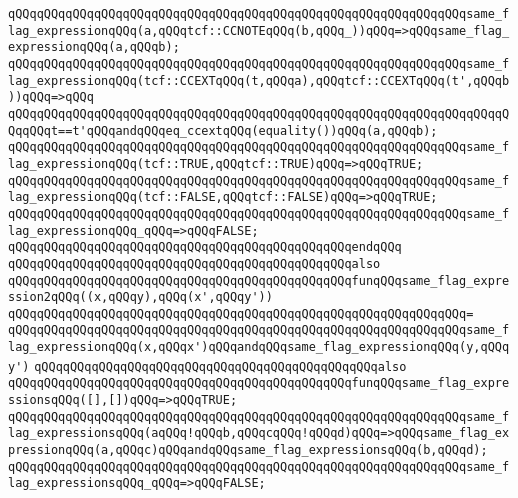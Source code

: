 \verb|qQQqqQQqqQQqqQQqqQQqqQQqqQQqqQQqqQQqqQQqqQQqqQQqqQQqqQQqqQQqqQQqsame_flag_expressionqQQq(a,qQQqtcf::CCNOTEqQQq(b,qQQq_))qQQq=>qQQqsame_flag_expressionqQQq(a,qQQqb);|\newline
\verb|qQQqqQQqqQQqqQQqqQQqqQQqqQQqqQQqqQQqqQQqqQQqqQQqqQQqqQQqqQQqqQQqsame_flag_expressionqQQq(tcf::CCEXTqQQq(t,qQQqa),qQQqtcf::CCEXTqQQq(t',qQQqb))qQQq=>qQQq|\newline
\verb|qQQqqQQqqQQqqQQqqQQqqQQqqQQqqQQqqQQqqQQqqQQqqQQqqQQqqQQqqQQqqQQqqQQqqQQqqQQqt==t'qQQqandqQQqeq_ccextqQQq(equality())qQQq(a,qQQqb);|\newline
\verb|qQQqqQQqqQQqqQQqqQQqqQQqqQQqqQQqqQQqqQQqqQQqqQQqqQQqqQQqqQQqqQQqsame_flag_expressionqQQq(tcf::TRUE,qQQqtcf::TRUE)qQQq=>qQQqTRUE;|\newline
\verb|qQQqqQQqqQQqqQQqqQQqqQQqqQQqqQQqqQQqqQQqqQQqqQQqqQQqqQQqqQQqqQQqsame_flag_expressionqQQq(tcf::FALSE,qQQqtcf::FALSE)qQQq=>qQQqTRUE;|\newline
\verb|qQQqqQQqqQQqqQQqqQQqqQQqqQQqqQQqqQQqqQQqqQQqqQQqqQQqqQQqqQQqqQQqsame_flag_expressionqQQq_qQQq=>qQQqFALSE;|\newline
\verb|qQQqqQQqqQQqqQQqqQQqqQQqqQQqqQQqqQQqqQQqqQQqqQQqendqQQq|\newline
\newline
\verb|qQQqqQQqqQQqqQQqqQQqqQQqqQQqqQQqqQQqqQQqqQQqqQQqalso|\newline
\verb|qQQqqQQqqQQqqQQqqQQqqQQqqQQqqQQqqQQqqQQqqQQqqQQqfunqQQqsame_flag_expression2qQQq((x,qQQqy),qQQq(x',qQQqy'))|\newline
\verb|qQQqqQQqqQQqqQQqqQQqqQQqqQQqqQQqqQQqqQQqqQQqqQQqqQQqqQQqqQQqqQQq=|\newline
\verb|qQQqqQQqqQQqqQQqqQQqqQQqqQQqqQQqqQQqqQQqqQQqqQQqqQQqqQQqqQQqqQQqsame_flag_expressionqQQq(x,qQQqx')qQQqandqQQqsame_flag_expressionqQQq(y,qQQqy')|\newline
\newline
\verb|qQQqqQQqqQQqqQQqqQQqqQQqqQQqqQQqqQQqqQQqqQQqqQQqalso|\newline
\verb|qQQqqQQqqQQqqQQqqQQqqQQqqQQqqQQqqQQqqQQqqQQqqQQqfunqQQqsame_flag_expressionsqQQq([],[])qQQq=>qQQqTRUE;|\newline
\verb|qQQqqQQqqQQqqQQqqQQqqQQqqQQqqQQqqQQqqQQqqQQqqQQqqQQqqQQqqQQqqQQqsame_flag_expressionsqQQq(aqQQq!qQQqb,qQQqcqQQq!qQQqd)qQQq=>qQQqsame_flag_expressionqQQq(a,qQQqc)qQQqandqQQqsame_flag_expressionsqQQq(b,qQQqd);|\newline
\verb|qQQqqQQqqQQqqQQqqQQqqQQqqQQqqQQqqQQqqQQqqQQqqQQqqQQqqQQqqQQqqQQqsame_flag_expressionsqQQq_qQQq=>qQQqFALSE;|\newline

